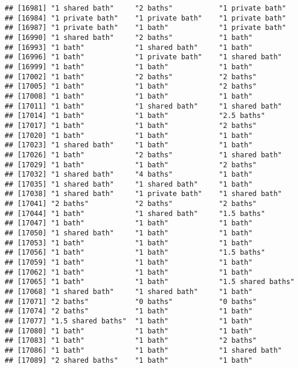 \documentclass[
]{article}
\begin{document}
\begin{verbatim}
## [16981] "1 shared bath"     "2 baths"           "1 private bath"   
## [16984] "1 private bath"    "1 private bath"    "1 private bath"   
## [16987] "1 private bath"    "1 bath"            "1 private bath"   
## [16990] "1 shared bath"     "2 baths"           "1 bath"           
## [16993] "1 bath"            "1 shared bath"     "1 bath"           
## [16996] "1 bath"            "1 private bath"    "1 shared bath"    
## [16999] "1 bath"            "1 bath"            "1 bath"           
## [17002] "1 bath"            "2 baths"           "2 baths"          
## [17005] "1 bath"            "1 bath"            "2 baths"          
## [17008] "1 bath"            "1 bath"            "1 bath"           
## [17011] "1 bath"            "1 shared bath"     "1 shared bath"    
## [17014] "1 bath"            "1 bath"            "2.5 baths"        
## [17017] "1 bath"            "1 bath"            "2 baths"          
## [17020] "1 bath"            "1 bath"            "1 bath"           
## [17023] "1 shared bath"     "1 bath"            "1 bath"           
## [17026] "1 bath"            "2 baths"           "1 shared bath"    
## [17029] "1 bath"            "1 bath"            "2 baths"          
## [17032] "1 shared bath"     "4 baths"           "1 bath"           
## [17035] "1 shared bath"     "1 shared bath"     "1 bath"           
## [17038] "1 shared bath"     "1 private bath"    "1 shared bath"    
## [17041] "2 baths"           "2 baths"           "2 baths"          
## [17044] "1 bath"            "1 shared bath"     "1.5 baths"        
## [17047] "1 bath"            "1 bath"            "1 bath"           
## [17050] "1 shared bath"     "1 bath"            "1 bath"           
## [17053] "1 bath"            "1 bath"            "1 bath"           
## [17056] "1 bath"            "1 bath"            "1.5 baths"        
## [17059] "1 bath"            "1 bath"            "1 bath"           
## [17062] "1 bath"            "1 bath"            "1 bath"           
## [17065] "1 bath"            "1 bath"            "1.5 shared baths" 
## [17068] "1 shared bath"     "1 shared bath"     "1 bath"           
## [17071] "2 baths"           "0 baths"           "0 baths"          
## [17074] "2 baths"           "1 bath"            "1 bath"           
## [17077] "1.5 shared baths"  "1 bath"            "1 bath"           
## [17080] "1 bath"            "1 bath"            "1 bath"           
## [17083] "1 bath"            "1 bath"            "2 baths"          
## [17086] "1 bath"            "1 bath"            "1 shared bath"    
## [17089] "2 shared baths"    "1 bath"            "1 bath"           

\end{verbatim}
\end{document}
